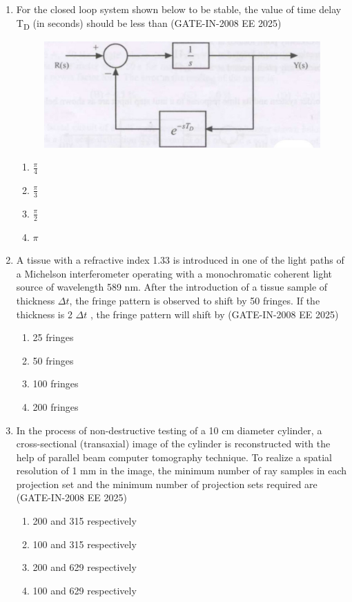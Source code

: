 \documentclass[journal,12pt,onecolumn]{IEEEtran}
\theoremstyle{remark}
\begin{document}
\begin{enumerate}[label=Q.\arabic*,start=1]
\item For the closed loop system shown below to be stable, the value of time delay T\textsubscript{D}  (in seconds)
should be less than (GATE-IN-2008 EE 2025)
\begin{figure}[H]
    \centering
    \includegraphics[width=0.5\linewidth]{figs/i31.jpg}
    \label{fig:placeholder31}
\end{figure}
           \begin{enumerate} 
              \item $\frac{\pi}{4}$           
              \item $\frac{\pi}{3}$           
              \item $\frac{\pi}{2}$           
              \item ${\pi}$           
            \end{enumerate} 

\item A tissue with a refractive index 1.33 is introduced in one of the light paths of a Michelson
interferometer operating with a monochromatic coherent light source of wavelength 589 nm. After
the introduction of a tissue sample of thickness $\Delta$$t$, the fringe pattern is observed to shift by
50 fringes. If the thickness is 2 $\Delta$$t$ , the fringe pattern will shift by (GATE-IN-2008 EE 2025)
           \begin{enumerate} 
              \item 25 fringes        
              \item 50 fringes
              \item 100 fringes
              \item 200 fringes
            \end{enumerate}

\item In the process of non-destructive testing of a 10 cm diameter cylinder, a cross-sectional (transaxial) image of the cylinder is reconstructed with the help of parallel beam computer tomography
technique. To realize a spatial resolution of 1 mm in the image, the minimum number of ray
samples in each projection set and the minimum number of projection sets required are (GATE-IN-2008 EE 2025)
           \begin{enumerate} 
              \item  200 and 315 respectively          
              \item  100 and 315 respectively
              \item  200 and 629 respectively
              \item  100 and 629 respectively
            \end{enumerate}



\end{enumerate}
\end{document}
